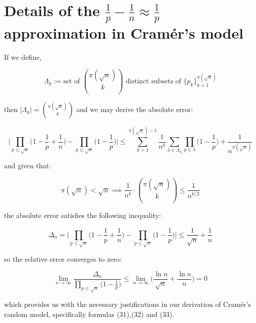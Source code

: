 \documentclass{article}
\begin{document}
\newpage

\section{Details of the $\frac{1}{p} - \frac{1}{n} \approx \frac{1}{p}$ approximation in Cramér's model}

If we define,

\begin{equation}
\Lambda_k := \text{set of } {\pi(\sqrt{n}) \choose k} \text{ distinct subsets of } \{p_k\}_{k=1}^{\pi(\sqrt{n})}
\end{equation}

then $\lvert \Lambda_k \rvert = {\pi(\sqrt{n}) \choose k}$ and we may derive the absolute error:

\begin{equation}
\Big\lvert \prod_{p \leq \sqrt{n}} \big(1-\frac{1}{p} + \frac{1}{n}) - \prod_{p \leq \sqrt{n}} \big(1-\frac{1}{p}\big) \Big\rvert \leq \sum_{k=1}^{\pi(\sqrt{n})-1} \frac{1}{n^k} \sum_{\lambda \in \Lambda_k} \prod_{p \in \lambda} \big(1-\frac{1}{p}\big) + \frac{1}{n^{\pi(\sqrt{n})}}
\end{equation}

and given that:

\begin{equation}
\pi(\sqrt{n}) < \sqrt{n} \implies \frac{1}{n^k} \cdot {\pi(\sqrt{n}) \choose k} \leq \frac{1}{n^{k/2}}
\end{equation}

the absolute error satisfies the following inequality:

\begin{equation}
\Delta_n = \Big\lvert \prod_{p \leq \sqrt{n}} \big(1- \frac{1}{p}+\frac{1}{n}\big) - \prod_{p \leq \sqrt{n}} \big(1- \frac{1}{p}\big)  \Big\rvert \leq \frac{1}{\sqrt{n}} + \frac{1}{n}
\end{equation}

so the relative error converges to zero:

\begin{equation}
\lim_{n \to \infty} \frac{\Delta_n}{\prod_{p \leq \sqrt{n}} \big(1- \frac{1}{p}\big)} \leq \lim_{n \to \infty} \big(\frac{\ln n}{\sqrt{n}} + \frac{\ln n}{n}\big) = 0
\end{equation}

which provides us with the necessary justifications in our derivation of Cramér's random model, specifically
formulas (31),(32) and (33).

\newpage
\end{document}

